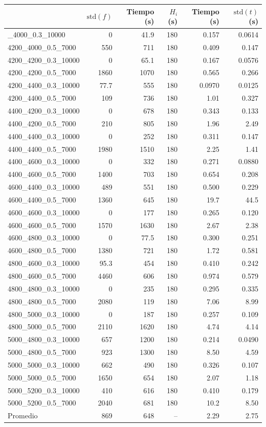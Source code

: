 \begin{landscape}
\begin{longtable}{lrrrrr}
 & $\mathrm{std}(f)$ & Tiempo (s) & $H_i$ (s) & Tiempo (s) & $\mathrm{std}(t)$ (s)\\
\midrule\endhead
\bottomrule\endlastfoot
4200\_4000\_0.3\_10000 & 0 & 41.9 & 180 & 0.157 & 0.0614\\
4200\_4000\_0.5\_7000 & 550 & 711 & 180 & 0.409 & 0.147\\
4200\_4200\_0.3\_10000 & 0 & 65.1 & 180 & 0.167 & 0.0576\\
4200\_4200\_0.5\_7000 & 1860 & 1070 & 180 & 0.565 & 0.266\\
4200\_4400\_0.3\_10000 & 77.7 & 555 & 180 & 0.0970 & 0.0125\\
4200\_4400\_0.5\_7000 & 109 & 736 & 180 & 1.01 & 0.327\\
4400\_4200\_0.3\_10000 & 0 & 678 & 180 & 0.343 & 0.133\\
4400\_4200\_0.5\_7000 & 210 & 805 & 180 & 1.96 & 2.49\\
4400\_4400\_0.3\_10000 & 0 & 252 & 180 & 0.311 & 0.147\\
4400\_4400\_0.5\_7000 & 1980 & 1510 & 180 & 2.25 & 1.41\\
4400\_4600\_0.3\_10000 & 0 & 332 & 180 & 0.271 & 0.0880\\
4400\_4600\_0.5\_7000 & 1400 & 703 & 180 & 0.654 & 0.208\\
4600\_4400\_0.3\_10000 & 489 & 551 & 180 & 0.500 & 0.229\\
4600\_4400\_0.5\_7000 & 1360 & 645 & 180 & 19.7 & 44.5\\
4600\_4600\_0.3\_10000 & 0 & 177 & 180 & 0.265 & 0.120\\
4600\_4600\_0.5\_7000 & 1570 & 1630 & 180 & 2.67 & 2.38\\
4600\_4800\_0.3\_10000 & 0 & 77.5 & 180 & 0.300 & 0.251\\
4600\_4800\_0.5\_7000 & 1380 & 721 & 180 & 1.72 & 0.581\\
4800\_4600\_0.3\_10000 & 95.3 & 454 & 180 & 0.410 & 0.242\\
4800\_4600\_0.5\_7000 & 4460 & 606 & 180 & 0.974 & 0.579\\
4800\_4800\_0.3\_10000 & 0 & 235 & 180 & 0.295 & 0.335\\
4800\_4800\_0.5\_7000 & 2080 & 119 & 180 & 7.06 & 8.99\\
4800\_5000\_0.3\_10000 & 0 & 187 & 180 & 0.257 & 0.109\\
4800\_5000\_0.5\_7000 & 2110 & 1620 & 180 & 4.74 & 4.14\\
5000\_4800\_0.3\_10000 & 657 & 1200 & 180 & 0.214 & 0.0490\\
5000\_4800\_0.5\_7000 & 923 & 1300 & 180 & 8.50 & 4.59\\
5000\_5000\_0.3\_10000 & 662 & 490 & 180 & 0.326 & 0.107\\
5000\_5000\_0.5\_7000 & 1650 & 654 & 180 & 2.07 & 1.18\\
5000\_5200\_0.3\_10000 & 410 & 616 & 180 & 0.410 & 0.179\\
5000\_5200\_0.5\_7000 & 2040 & 681 & 180 & 10.2 & 8.50\\
\midrule
Promedio & 869 & 648 & -- & 2.29 & 2.75\\
\end{longtable}\clearpage
\end{landscape}
